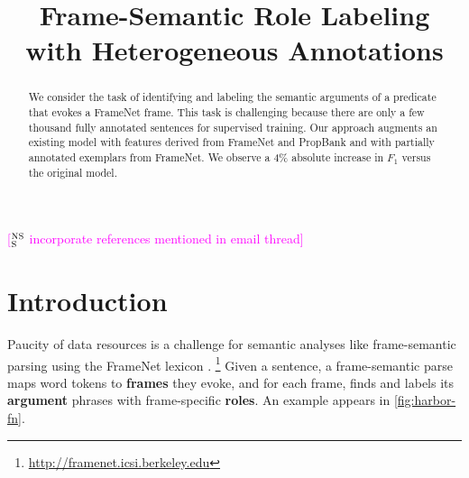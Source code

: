 \documentclass[11pt,a4paper]{article}
\title{Frame-Semantic Role Labeling with Heterogeneous Annotations}
\newcommand{\ensuretext}[1]{#1}
\newcommand{\nssmarker}{\ensuretext{\textcolor{magenta}{\ensuremath{^{\textsc{NS}}_{\textsc{S}}}}}}
\newcommand{\mkmarker}{\ensuretext{\textcolor{red}{\ensuremath{^{\textsc{M}}_{\textsc{K}}}}}}
\newcommand{\stmarker}{\ensuretext{\textcolor{orange}{\ensuremath{^{\textsc{S}}_{\textsc{T}}}}}}
\newcommand{\arkcomment}[3]{\ensuretext{\textcolor{#3}{[#1 #2]}}}
\newcommand{\nss}[1]{\arkcomment{\nssmarker}{#1}{magenta}}
\newcommand{\mk}[1]{\arkcomment{\mkmarker}{#1}{red}}
\newcommand{\st}[1]{\arkcomment{\stmarker}{#1}{orange}}
\begin{document}
\maketitle
\begin{abstract}
We consider the task of identifying and labeling the semantic
arguments of a predicate that evokes a FrameNet frame.  This task is
challenging because there are only a few thousand fully annotated
sentences for supervised training.  Our approach augments an existing %
model with features derived from FrameNet and PropBank and with
partially annotated exemplars from FrameNet.  We observe a 4\% absolute increase in $F_1$ 
versus the original model.

\end{abstract}

\nss{incorporate references mentioned in email thread}

\section{Introduction}

Paucity of data resources is a challenge for semantic analyses like
frame-semantic parsing \citep{gildea-02,das-14} using the
FrameNet lexicon \citep{baker-98,fillmore_frames_2010}.
\footnote{\url{http://framenet.icsi.berkeley.edu}}
Given a sentence, a frame-semantic parse maps word tokens
to \textbf{frames} they evoke, and for each frame, finds and labels
its \textbf{argument} phrases  
with frame-specific \textbf{roles}. 
An example appears in \cref{fig:harbor-fn}. %
\end{document}
